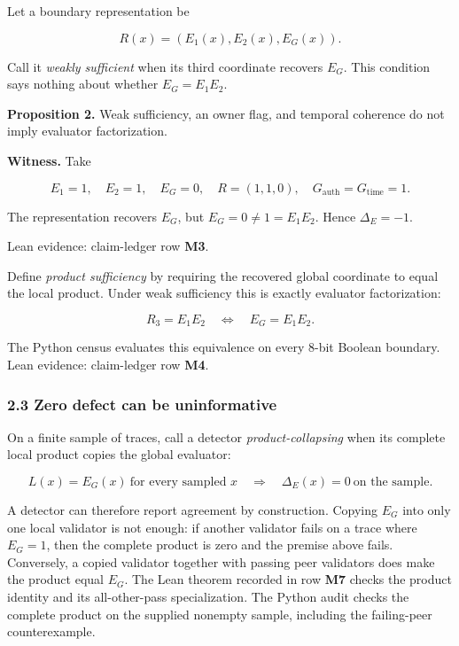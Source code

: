 \documentclass[
  11pt,
]{article}
\theoremstyle{plain}
\theoremstyle{definition}\newtheorem{definition}[theorem]{Definition}
\theoremstyle{remark}\newtheorem*{remark}{Remark}
\begin{document}
Let a boundary representation be

\[
R(x)=(E_1(x),E_2(x),E_G(x)).
\]

Call it \emph{weakly sufficient} when its third coordinate recovers
\(E_G\). This condition says nothing about whether \(E_G=E_1E_2\).

\textbf{Proposition 2.} Weak sufficiency, an owner flag, and temporal
coherence do not imply evaluator factorization.

\textbf{Witness.} Take

\[
E_1=1,\quad E_2=1,\quad E_G=0,\quad
R=(1,1,0),\quad G_{\mathrm{auth}}=G_{\mathrm{time}}=1.
\]

The representation recovers \(E_G\), but \(E_G=0\ne1=E_1E_2\). Hence
\(\Delta_E=-1\).

Lean evidence: claim-ledger row \textbf{M3}.

Define \emph{product sufficiency} by requiring the recovered global
coordinate to equal the local product. Under weak sufficiency this is
exactly evaluator factorization:

\[
R_3=E_1E_2 \quad\Longleftrightarrow\quad E_G=E_1E_2.
\]

The Python census evaluates this equivalence on every 8-bit Boolean
boundary. Lean evidence: claim-ledger row \textbf{M4}.

\subsubsection{2.3 Zero defect can be
uninformative}\label{zero-defect-can-be-uninformative}

On a finite sample of traces, call a detector \emph{product-collapsing}
when its complete local product copies the global evaluator:

\[
L(x)=E_G(x)\ \text{for every sampled }x
\quad\Longrightarrow\quad
\Delta_E(x)=0\ \text{on the sample}.
\]

A detector can therefore report agreement by construction. Copying
\(E_G\) into only one local validator is not enough: if another
validator fails on a trace where \(E_G=1\), then the complete product is
zero and the premise above fails. Conversely, a copied validator
together with passing peer validators does make the product equal
\(E_G\). The Lean theorem recorded in row \textbf{M7} checks the product
identity and its all-other-pass specialization. The Python audit checks
the complete product on the supplied nonempty sample, including the
failing-peer counterexample.
\end{document}
